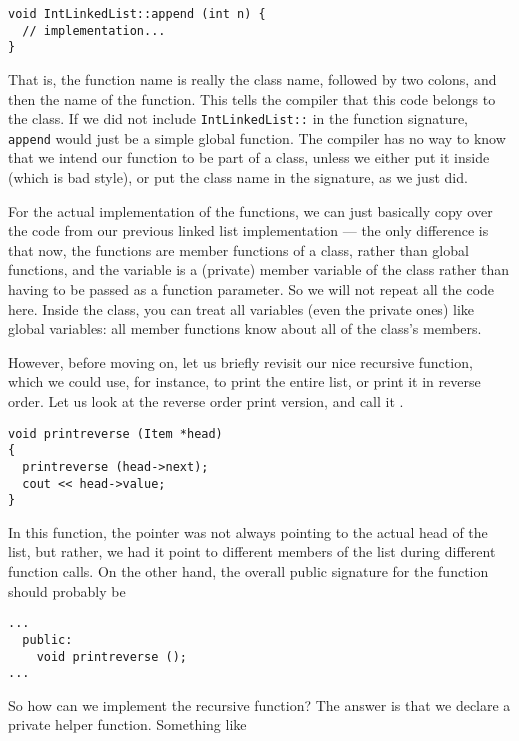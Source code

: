 \begin{verbatim}
void IntLinkedList::append (int n) {
  // implementation...
}
\end{verbatim}

That is, the function name is really the class name, followed by two
colons, and then the name of the function.
This tells the compiler that this code belongs to the class. 
If we did not include \texttt{IntLinkedList::} in the function
signature, \texttt{append} would just be a simple global function. 
The compiler has no way to know that we intend our function to be part
of a class, unless we either put it inside 
 (which is bad style),
or put the class name in the signature, as we just did.

For the actual implementation of the functions, we can just basically
copy over the code from our previous linked list implementation --- 
the only difference is that now, the functions are member functions of
a class, rather than global functions, and the variable  is
a (private) member variable of the class rather than having to be
passed as a function parameter.
So we will not repeat all the code here. Inside the class, you can treat
all variables (even the private ones) like global variables:
all member functions know about all of the class's members.

However, before moving on, let us briefly revisit our nice recursive
 function, which we could use, for instance, to print
the entire list, or print it in reverse order. Let us look at the
reverse order print version, and call it .

\begin{verbatim}
void printreverse (Item *head)
{
  printreverse (head->next);
  cout << head->value;
}
\end{verbatim}

In this function, the  pointer was not always pointing to
the actual head of the list, but rather, we had it point to different
members of the list during different function calls.
On the other hand, the overall public signature for the function
should probably be

\begin{verbatim}
...
  public:
    void printreverse ();
...
\end{verbatim}

So how can we implement the recursive function? The answer is that we
declare a private helper function. Something like

